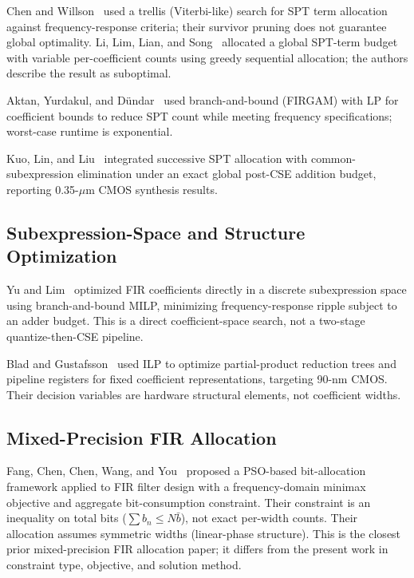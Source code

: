 Chen and Willson~\cite{chen1999trellis} used a trellis (Viterbi-like)
search for SPT term allocation against frequency-response criteria; their
survivor pruning does not guarantee global optimality. Li, Lim, Lian,
and Song~\cite{li2002polynomial} allocated a global SPT-term budget with
variable per-coefficient counts using greedy sequential allocation;
the authors describe the result as suboptimal.

Aktan, Yurdakul, and D\"{u}ndar~\cite{aktan2008algorithm} used
branch-and-bound (FIRGAM) with LP for coefficient bounds to reduce SPT
count while meeting frequency specifications; worst-case runtime is
exponential.

Kuo, Lin, and Liu~\cite{kuo2011complexity} integrated successive SPT
allocation with common-subexpression elimination under an exact global
post-CSE addition budget, reporting 0.35-$\mu$m CMOS synthesis results.

\subsection{Subexpression-Space and Structure Optimization}

Yu and Lim~\cite{yu2007subexpression} optimized FIR coefficients
directly in a discrete subexpression space using branch-and-bound MILP,
minimizing frequency-response ripple subject to an adder budget. This is
a direct coefficient-space search, not a two-stage quantize-then-CSE
pipeline.

Blad and Gustafsson~\cite{blad2010integer} used ILP to optimize
partial-product reduction trees and pipeline registers for fixed
coefficient representations, targeting 90-nm CMOS. Their decision
variables are hardware structural elements, not coefficient widths.

\subsection{Mixed-Precision FIR Allocation}

Fang, Chen, Chen, Wang, and You~\cite{fang2025mixedprecision} proposed a
PSO-based bit-allocation framework applied to FIR filter design with a
frequency-domain minimax objective and aggregate bit-consumption
constraint. Their constraint is an inequality on total bits ($\sum b_n
\le N \bar{b}$), not exact per-width counts. Their allocation assumes
symmetric widths (linear-phase structure). This is the closest prior
mixed-precision FIR allocation paper; it differs from the present work
in constraint type, objective, and solution method.

